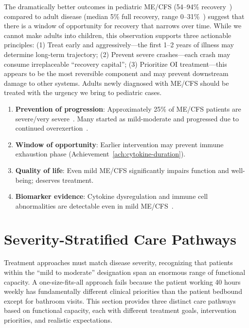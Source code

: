 \begin{keypoint}
The dramatically better outcomes in pediatric ME/CFS (54--94\% recovery~\cite{Joyce1997prognosis})
compared to adult disease (median 5\% full recovery, range 0--31\%~\cite{Cairns2005prognosis}) suggest that there is a window of
opportunity for recovery that narrows over time. While we cannot make adults
into children, this observation supports three actionable principles:
(1) Treat early and aggressively---the first 1--2 years of illness may
determine long-term trajectory; (2) Prevent severe crashes---each crash
may consume irreplaceable ``recovery capital''; (3) Prioritize OI
treatment---this appears to be the most reversible component and may prevent
downstream damage to other systems. Adults newly diagnosed with ME/CFS should
be treated with the urgency we bring to pediatric cases.
\end{keypoint}

\begin{enumerate}
    \item \textbf{Prevention of progression}: Approximately 25\% of ME/CFS patients are severe/very severe~\cite{Rowe2017pediatric}. Many started as mild-moderate and progressed due to continued overexertion~\cite{Lacourt2022prognosis}.
    \item \textbf{Window of opportunity}: Earlier intervention may prevent immune exhaustion phase (Achievement~\ref{ach:cytokine-duration}).
    \item \textbf{Quality of life}: Even mild ME/CFS significantly impairs function and well-being; deserves treatment.
    \item \textbf{Biomarker evidence}: Cytokine dysregulation and immune cell abnormalities are detectable even in mild ME/CFS~\cite{Hornig2015,Giloteaux2023}.
\end{enumerate}

\section{Severity-Stratified Care Pathways}
\label{sec:severity-stratified-pathways}

Treatment approaches must match disease severity, recognizing that patients within the ``mild to moderate'' designation span an enormous range of functional capacity. A one-size-fits-all approach fails because the patient working 40 hours weekly has fundamentally different clinical priorities than the patient bedbound except for bathroom visits. This section provides three distinct care pathways based on functional capacity, each with different treatment goals, intervention priorities, and realistic expectations.

